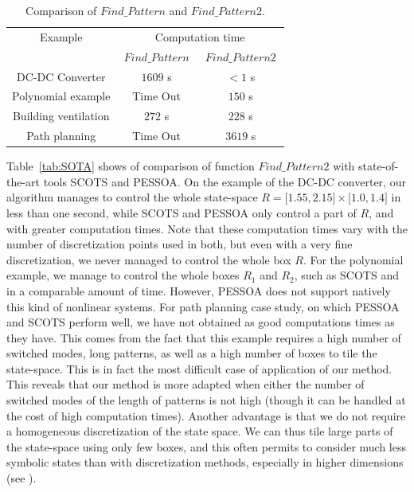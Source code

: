 \begin{table}[t]
  \centering
  \caption{Comparison of $Find\_Pattern$ and $Find\_Pattern2$.}
  \label{tab:FP1-FP2}
  \begin{tabular}{|c|c|c|}
    \hline
    Example & \multicolumn{2}{c|}{Computation time} \\
    \cline{2-3} & $~Find\_Pattern~$ & $~Find\_Pattern2~$   \\
    \hline
    DC-DC Converter &    $1609$ s  &  $< 1$ s \\
    Polynomial example & Time Out   & $150$ s  \\
    Building ventilation & $272$ s & $228$ s  \\
    Path planning & Time Out & $3619$ s \\
    \hline
  \end{tabular}
\end{table}

Table~\ref{tab:SOTA} shows of comparison of function $Find\_Pattern2$
with state-of-the-art tools SCOTS and PESSOA.  On the example of the
DC-DC converter, our algorithm manages to control the whole
state-space $R=\lbrack 1.55 , 2.15 \rbrack \times \lbrack 1.0 , 1.4
\rbrack$ in less than one second, while SCOTS and PESSOA only control
a part of $R$, and with greater computation times. Note that these
computation times vary with the number of discretization points used
in both, but even with a very fine discretization, we never managed to
control the whole box $R$.  For the polynomial example, we manage to
control the whole boxes $R_1$ and $R_2$, such as SCOTS and in a
comparable amount of time. However, PESSOA does not support natively
this kind of nonlinear systems. For path planning case study, on which
PESSOA and SCOTS perform well, we have not obtained as good
computations times as they have.  This comes from the fact that this
example requires a high number of switched modes, long patterns, as
well as a high number of boxes to tile the state-space.  This is in
fact the most difficult case of application of our method.  This
reveals that our method is more adapted when either the number of
switched modes of the length of patterns is not high (though it can be
handled at the cost of high computation times).  Another advantage is
that we do not require a homogeneous discretization of the state
space. We can thus tile large parts of the state-space using only few
boxes, and this often permits to consider much less symbolic states
than with discretization methods, especially in higher dimensions (see
\cite{LeCoent2016}).



